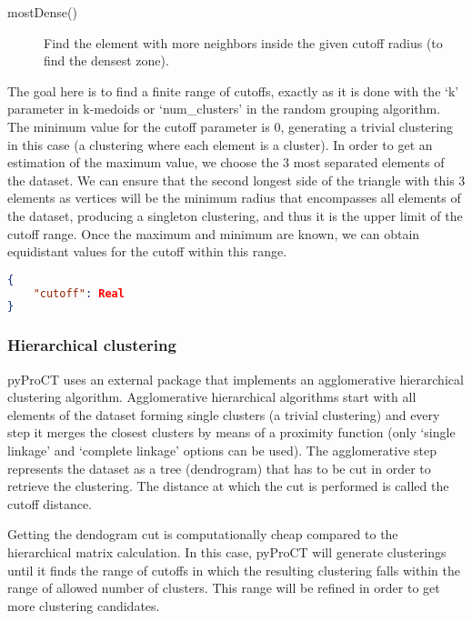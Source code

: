 \begin{description}
\item [mostDense()] Find the element with more neighbors inside the given cutoff radius
(to find the densest zone). 
\end{description}


The goal here is to find a finite range of cutoffs, exactly as it is done with
the `k' parameter in k-medoids or `num\_clusters' in the random grouping
algorithm. The minimum value for the cutoff parameter is 0, generating
a trivial clustering in this case (a clustering where each element
is a cluster). In order to get an estimation of the maximum value,
we choose the 3 most separated elements of the dataset. We can ensure
that the second longest side of the triangle with this 3 elements
as vertices will be the minimum radius that encompasses all elements
of the dataset, producing a singleton clustering, and thus it is the
upper limit of the cutoff range. Once the maximum and minimum are
known, we can obtain equidistant values for the cutoff within this
range.


\begin{lstlisting}[language=json,firstnumber=1] 
{ 	
	"cutoff": Real
}
\end{lstlisting}


\subsubsection{Hierarchical clustering}

pyProCT uses an external package \cite{mullner_fastcluster_2013}
that implements an agglomerative hierarchical clustering algorithm.
Agglomerative hierarchical algorithms start with all elements of the
dataset forming single clusters (a trivial clustering) and every step
it merges the closest clusters by means of a proximity function (only
`single linkage' and `complete linkage' options can be used). The
agglomerative step represents the dataset as a tree (dendrogram) that
has to be cut in order to retrieve the clustering. The distance at
which the cut is performed is called the cutoff distance.



Getting the dendogram cut is computationally cheap compared to the
hierarchical matrix calculation. In this case, pyProCT will generate
clusterings until it finds the range of cutoffs in which the resulting
clustering falls within the range of allowed number of clusters. This
range will be refined in order to get more clustering candidates.


